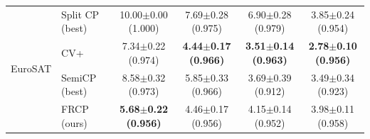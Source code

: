 \begin{table}[t]
\begin{tabular}{llcccc}
\midrule
\multirow{4}{*}{EuroSAT} & Split CP (best) & 10.00$\pm$0.00 {\scriptsize(1.000)} & 7.69$\pm$0.28 {\scriptsize(0.975)} & 6.90$\pm$0.28 {\scriptsize(0.979)} & 3.85$\pm$0.24 {\scriptsize(0.954)}\\
 & CV+ & 7.34$\pm$0.22 {\scriptsize(0.974)} & \textbf{4.44$\pm$0.17 {\scriptsize(0.966)}} & \textbf{3.51$\pm$0.14 {\scriptsize(0.963)}} & \textbf{2.78$\pm$0.10 {\scriptsize(0.956)}}\\
 & SemiCP (best) & 8.58$\pm$0.32 {\scriptsize(0.973)} & 5.85$\pm$0.33 {\scriptsize(0.966)} & 3.69$\pm$0.39 {\scriptsize(0.912)} & 3.49$\pm$0.34 {\scriptsize(0.923)}\\
 & FRCP (ours) & \textbf{5.68$\pm$0.22 {\scriptsize(0.956)}} & 4.46$\pm$0.17 {\scriptsize(0.956)} & 4.15$\pm$0.14 {\scriptsize(0.952)} & 3.98$\pm$0.11 {\scriptsize(0.958)}\\
\bottomrule
\end{tabular}
\end{table}
